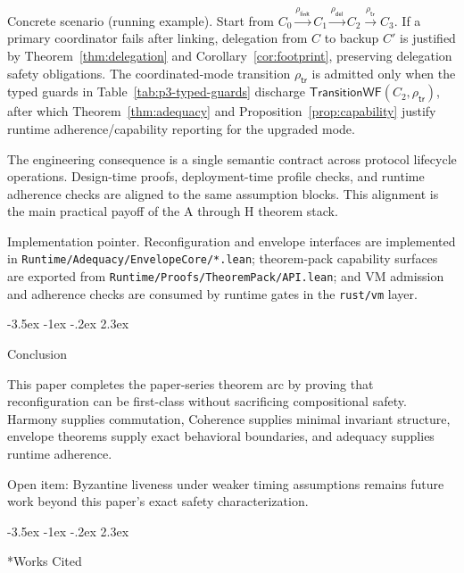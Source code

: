 \documentclass[a4paper,10pt,twocolumn,english]{article}
\makeatletter
\renewcommand{\section}{\@startsection{section}{1}{\z@}%
  {-3.5ex \@plus -1ex \@minus -.2ex}%
  {2.3ex}%
  {\raggedright\normalfont\large\bfseries}}
\numberwithin{equation}{section}
\theoremstyle{paperdef}
\theoremstyle{paperplain}
\theoremstyle{paperdef}
\theoremstyle{paperremark}
\theoremstyle{paperdef}
\makeatother
\begin{document}
Concrete scenario (running example). Start from
$C_0 \xrightarrow{\rho_{\mathsf{link}}} C_1 \xrightarrow{\rho_{\mathsf{del}}}
	C_2 \xrightarrow{\rho_{\mathsf{tr}}} C_3$. If a primary coordinator fails after
linking, delegation from $C$ to backup $C'$ is justified by
Theorem~\ref{thm:delegation} and Corollary~\ref{cor:footprint}, preserving
delegation safety obligations. The coordinated-mode transition
$\rho_{\mathsf{tr}}$ is admitted only when the typed guards in
Table~\ref{tab:p3-typed-guards} discharge
$\mathsf{TransitionWF}(C_2,\rho_{\mathsf{tr}})$, after which
Theorem~\ref{thm:adequacy} and Proposition~\ref{prop:capability} justify runtime
adherence/capability reporting for the upgraded mode.

The engineering consequence is a single semantic contract across protocol lifecycle operations. Design-time proofs, deployment-time profile checks, and runtime adherence checks are aligned to the same assumption blocks. This alignment is the main practical payoff of the A through H theorem stack.

Implementation pointer. Reconfiguration and envelope interfaces are implemented
in \texttt{Runtime/Adequacy/EnvelopeCore/*.lean}; theorem-pack capability
surfaces are exported from \texttt{Runtime/Proofs/TheoremPack/API.lean}; and VM
admission and adherence checks are consumed by runtime gates in the
\texttt{rust/vm} layer.

\section{Conclusion}
\label{sec:conclusion}

This paper completes the paper-series theorem arc by proving that reconfiguration can be first-class without sacrificing compositional safety. Harmony supplies commutation, Coherence supplies minimal invariant structure, envelope theorems supply exact behavioral boundaries, and adequacy supplies runtime adherence.

Open item: Byzantine liveness under weaker timing assumptions remains future work beyond this paper's exact safety characterization.

\section*{Works Cited}
\end{document}
